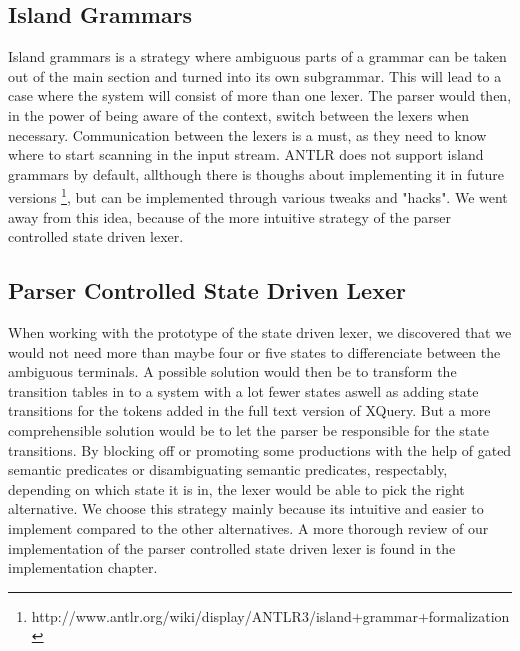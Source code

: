 \subsection{Island Grammars}
\label{sect:amiguousgrammar:islandGrammar}
Island grammars \cite{islandGrammar} is a strategy where ambiguous parts of a grammar can be taken out of the main section and turned into its own subgrammar. This will lead to a case where the system will consist of more than one lexer. The parser would then, in the power of being aware of the context, switch between the lexers when necessary. Communication between the lexers is a must, as they need to know where to start scanning in the input stream. ANTLR does not support island grammars by default, allthough there is thoughs about implementing it in future versions \footnote{http://www.antlr.org/wiki/display/ANTLR3/island+grammar+formalization}, but can be implemented through various tweaks and "hacks". We went away from this idea, because of the more intuitive strategy of the parser controlled state driven lexer.

\subsection{Parser Controlled State Driven Lexer}
\label{sect:amiguousgrammar:parserControlled}
When working with the prototype of the state driven lexer, we discovered that we would not need more than maybe four or five states to differenciate between the ambiguous terminals. A possible solution would then be to transform the transition tables in \cite{createTokenizer} to a system with a lot fewer states aswell as adding state transitions for the tokens added in the full text version of XQuery. But a more comprehensible solution would be to let the parser be responsible for the state transitions. By blocking off or promoting some productions with the help of gated semantic predicates or disambiguating semantic predicates, respectably, depending on which state it is in, the lexer would be able to pick the right alternative. We choose this strategy mainly because its intuitive and easier to implement compared to the other alternatives. A more thorough review of our implementation of the parser controlled state driven lexer is found in the implementation chapter.

